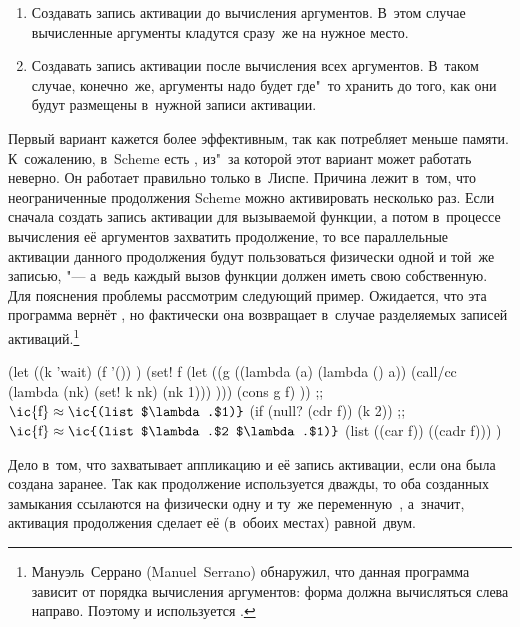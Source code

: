 \begin{enumerate}
  \item Создавать запись активации до вычисления аргументов. В~этом
        случае вычисленные аргументы кладутся сразу~же на нужное место.

  \item Создавать запись активации после вычисления всех аргументов.
        В~таком случае, конечно~же, аргументы надо будет где"~то хранить
        до того, как они будут размещены в~нужной записи активации.
\end{enumerate}

Первый вариант кажется более эффективным, так как потребляет меньше памяти.
К~сожалению, в~Scheme есть , из"~за которой этот вариант может
работать неверно. Он работает правильно только в~Лиспе. Причина лежит в~том,
что неограниченные продолжения Scheme можно активировать несколько раз.
 Если сначала создать запись
активации для вызываемой функции, а потом в~процессе вычисления её аргументов
захватить продолжение, то все параллельные активации данного продолжения будут
пользоваться физически одной и той~же записью, "--- а~ведь каждый вызов функции
должен иметь свою собственную. Для пояснения проблемы рассмотрим следующий
пример. Ожидается, что эта программа вернёт , но фактически она
возвращает  в~случае разделяемых записей активаций.\footnote*{%
Мануэль~Серрано (Manuel~Serrano) обнаружил, что данная программа зависит от
порядка вычисления аргументов: форма  должна вычисляться слева направо.
Поэтому и используется .}

\begin{code:lisp}
(let ((k 'wait)
      (f '()) )
  (set! f (let ((g ((lambda (a) (lambda () a))
                    (call/cc (lambda (nk) (set! k nk) (nk 1))) )))
            (cons g f) ))
  ;; $\text{\ic{f}} \approx \text{\ic{(list $\lambda.$1)}}$
  (if (null? (cdr f)) (k 2))
  ;; $\text{\ic{f}} \approx \text{\ic{(list $\lambda.$2 $\lambda.$1)}}$
  (list ((car f)) ((cadr f))) )
\end{code:lisp}

Дело в~том, что  захватывает аппликацию 
и её запись активации, если она была создана заранее. Так как продолжение
используется дважды, то оба созданных замыкания  ссылаются на
физически одну и ту~же переменную~, а~значит, активация продолжения
 сделает её (в~обоих местах) равной~двум.

